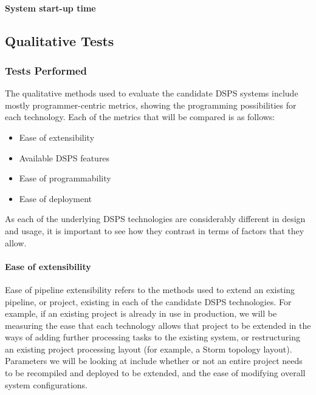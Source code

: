 \paragraph{System start-up time}





\subsection{Qualitative Tests} %
\label{sub:qualitative_tests}

\subsubsection{Tests Performed} %
\label{ssub:tests_performed}

The qualitative methods used to evaluate the candidate DSPS systems include mostly programmer-centric metrics, showing the
programming possibilities for each technology. Each of the metrics that will be compared is as follows:

\begin{itemize}
  \item Ease of extensibility
  \item Available DSPS features
  \item Ease of programmability
  \item Ease of deployment
\end{itemize}

As each of the underlying DSPS technologies are considerably different in design and usage, it is important to see how
they contrast in terms of factors that they allow.

\paragraph{Ease of extensibility}

Ease of pipeline extensibility refers to the methods used to extend an existing pipeline, or project, existing in each
of the candidate DSPS technologies. For example, if an existing project is already in use in production, we will be measuring the
ease that each technology allows that project to be extended in the ways of adding further processing tasks to the
existing system, or restructuring an existing project processing layout (for example, a Storm topology layout). Parameters
we will be looking at include whether or not an entire project needs to be recompiled and deployed to be extended, and the
ease of modifying overall system configurations.

